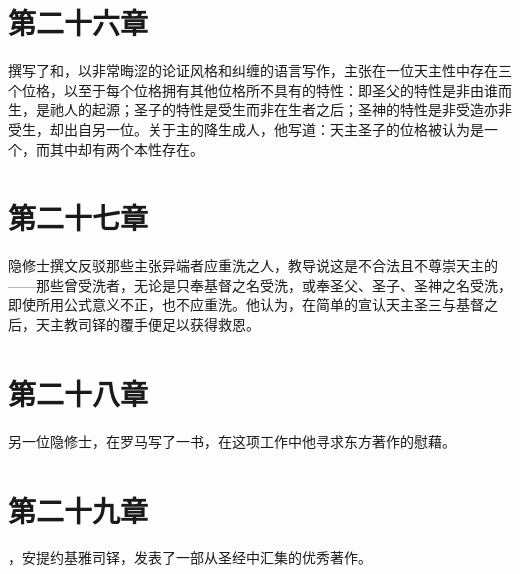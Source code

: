 
\section{第二十六章}

撰写了和，以非常晦涩的论证风格和纠缠的语言写作，主张在一位天主性中存在三个位格，以至于每个位格拥有其他位格所不具有的特性：即圣父的特性是非由谁而生，是祂人的起源；圣子的特性是受生而非在生者之后；圣神的特性是非受造亦非受生，却出自另一位。关于主的降生成人，他写道：天主圣子的位格被认为是一个，而其中却有两个本性存在。\par


\section{第二十七章}

隐修士撰文反驳那些主张异端者应重洗之人，教导说这是不合法且不尊崇天主的——那些曾受洗者，无论是只奉基督之名受洗，或奉圣父、圣子、圣神之名受洗，即使所用公式意义不正，也不应重洗。他认为，在简单的宣认天主圣三与基督之后，天主教司铎的覆手便足以获得救恩。\par


\section{第二十八章}

 另一位隐修士，在罗马写了一书，在这项工作中他寻求东方著作的慰藉。\par


\section{第二十九章}

，安提约基雅司铎，发表了一部从圣经中汇集的优秀著作。\par


